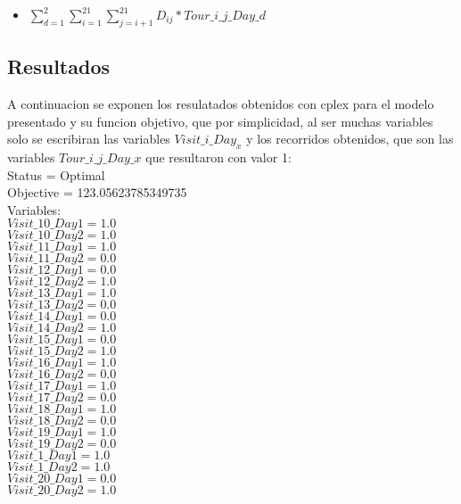 \begin{itemize}
\item $ \sum_{d=1}^{2} \sum_{i=1}^{21} \sum_{j=i+1}^{21} D_{ij} * Tour\_i\_j\_Day\_d $ \\
\end{itemize}

\subsection{Resultados}

A continuacion se exponen los resulatados obtenidos con cplex para el modelo presentado y su funcion objetivo, que por simplicidad, al ser muchas variables solo se escribiran las variables $Visit\_i\_Day_x$ y los recorridos obtenidos, que son las variables $Tour\_i\_j\_Day\_x$ que resultaron con valor 1: \\
Status = Optimal\\
Objective = 123.05623785349735\\
Variables: \\
$Visit\_10\_Day1 = 1.0$\\
$Visit\_10\_Day2 = 1.0$\\
$Visit\_11\_Day1 = 1.0$\\
$Visit\_11\_Day2 = 0.0$\\
$Visit\_12\_Day1 = 0.0$\\
$Visit\_12\_Day2 = 1.0$\\
$Visit\_13\_Day1 = 1.0$\\
$Visit\_13\_Day2 = 0.0$\\
$Visit\_14\_Day1 = 0.0$\\
$Visit\_14\_Day2 = 1.0$\\
$Visit\_15\_Day1 = 0.0$\\
$Visit\_15\_Day2 = 1.0$\\
$Visit\_16\_Day1 = 1.0$\\
$Visit\_16\_Day2 = 0.0$\\
$Visit\_17\_Day1 = 1.0$\\
$Visit\_17\_Day2 = 0.0$\\
$Visit\_18\_Day1 = 1.0$\\
$Visit\_18\_Day2 = 0.0$\\
$Visit\_19\_Day1 = 1.0$\\
$Visit\_19\_Day2 = 0.0$\\
$Visit\_1\_Day1 = 1.0$\\
$Visit\_1\_Day2 = 1.0$\\
$Visit\_20\_Day1 = 0.0$\\
$Visit\_20\_Day2 = 1.0$\\
